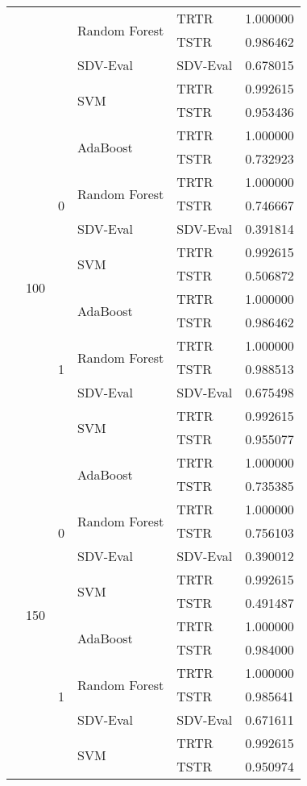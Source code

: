 \begin{longtable}{lllllr}
\cline{4-6}
 &  &  & \multirow[t]{2}{*}{Random Forest} & TRTR & 1.000000 \\
 &  &  &  & TSTR & 0.986462 \\
\cline{4-6}
 &  &  & SDV-Eval & SDV-Eval & 0.678015 \\
\cline{4-6}
 &  &  & \multirow[t]{2}{*}{SVM} & TRTR & 0.992615 \\
 &  &  &  & TSTR & 0.953436 \\
\cline{2-6} \cline{3-6} \cline{4-6}
 & \multirow[t]{14}{*}{100} & \multirow[t]{7}{*}{0} & \multirow[t]{2}{*}{AdaBoost} & TRTR & 1.000000 \\
 &  &  &  & TSTR & 0.732923 \\
\cline{4-6}
 &  &  & \multirow[t]{2}{*}{Random Forest} & TRTR & 1.000000 \\
 &  &  &  & TSTR & 0.746667 \\
\cline{4-6}
 &  &  & SDV-Eval & SDV-Eval & 0.391814 \\
\cline{4-6}
 &  &  & \multirow[t]{2}{*}{SVM} & TRTR & 0.992615 \\
 &  &  &  & TSTR & 0.506872 \\
\cline{3-6} \cline{4-6}
 &  & \multirow[t]{7}{*}{1} & \multirow[t]{2}{*}{AdaBoost} & TRTR & 1.000000 \\
 &  &  &  & TSTR & 0.986462 \\
\cline{4-6}
 &  &  & \multirow[t]{2}{*}{Random Forest} & TRTR & 1.000000 \\
 &  &  &  & TSTR & 0.988513 \\
\cline{4-6}
 &  &  & SDV-Eval & SDV-Eval & 0.675498 \\
\cline{4-6}
 &  &  & \multirow[t]{2}{*}{SVM} & TRTR & 0.992615 \\
 &  &  &  & TSTR & 0.955077 \\
\cline{2-6} \cline{3-6} \cline{4-6}
 & \multirow[t]{14}{*}{150} & \multirow[t]{7}{*}{0} & \multirow[t]{2}{*}{AdaBoost} & TRTR & 1.000000 \\
 &  &  &  & TSTR & 0.735385 \\
\cline{4-6}
 &  &  & \multirow[t]{2}{*}{Random Forest} & TRTR & 1.000000 \\
 &  &  &  & TSTR & 0.756103 \\
\cline{4-6}
 &  &  & SDV-Eval & SDV-Eval & 0.390012 \\
\cline{4-6}
 &  &  & \multirow[t]{2}{*}{SVM} & TRTR & 0.992615 \\
 &  &  &  & TSTR & 0.491487 \\
\cline{3-6} \cline{4-6}
 &  & \multirow[t]{7}{*}{1} & \multirow[t]{2}{*}{AdaBoost} & TRTR & 1.000000 \\
 &  &  &  & TSTR & 0.984000 \\
\cline{4-6}
 &  &  & \multirow[t]{2}{*}{Random Forest} & TRTR & 1.000000 \\
 &  &  &  & TSTR & 0.985641 \\
\cline{4-6}
 &  &  & SDV-Eval & SDV-Eval & 0.671611 \\
\cline{4-6}
 &  &  & \multirow[t]{2}{*}{SVM} & TRTR & 0.992615 \\
 &  &  &  & TSTR & 0.950974 \\
\cline{1-6} \cline{2-6} \cline{3-6} \cline{4-6}
\end{longtable}
